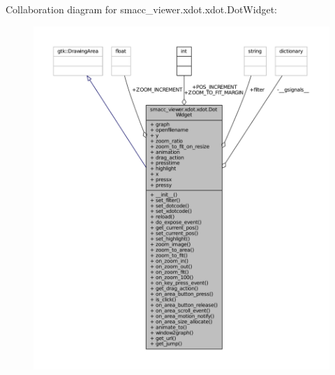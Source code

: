 Collaboration diagram for smacc\+\_\+viewer.\+xdot.\+xdot.\+Dot\+Widget\+:
\nopagebreak
\begin{figure}[H]
\begin{center}
\leavevmode
\includegraphics[width=350pt]{classsmacc__viewer_1_1xdot_1_1xdot_1_1DotWidget__coll__graph}
\end{center}
\end{figure}
